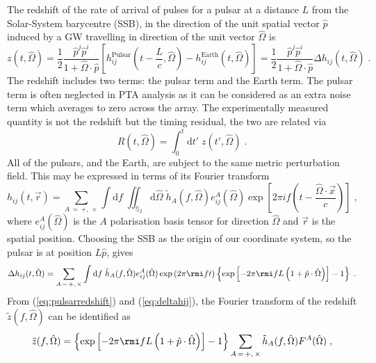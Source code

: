 The redshift of the rate of arrival of pulses for a pulsar at a distance $L$ from the Solar-System barycentre (SSB), in the direction of the unit spatial vector $\hat{p}$ induced by a GW travelling in direction of the unit vector $\hat{\Omega}$ is \citep{anholm-2009}
\begin{equation}\label{eq:pulsarredshift}
z(t,\hat{\Omega})= \frac{1}{2} \frac{\hat{p}^{j}\hat{p}^{i}} {1+\hat{\Omega}\cdot\hat{p}}\left[h_{ij}^{\mathrm{Pulsar}}\left(t-\frac{L}{c},\hat{\Omega} \right)-h_{ij}^{\mathrm{Earth}}(t,\hat{\Omega} )\right] = \frac{1}{2}\frac{\hat{p}^{j}\hat{p}^{i}}{1+\hat{\Omega}\cdot\hat{p}} \Delta h_{ij}(t,\hat{\Omega})\; .
\end{equation}
The redshift includes two terms: the pulsar term and the Earth term. The pulsar term is often neglected in PTA analysis as it can be considered as an extra noise term which averages to zero across the array. The experimentally measured quantity is not the redshift but the timing residual, the two are related via
\begin{equation}\label{eq:restored}
R(t,\hat{\Omega}) = \int_{0}^{t}\mathrm{d}t'\;z(t',\hat{\Omega}) \; .
\end{equation}
All of the pulsars, and the Earth, are subject to the same metric perturbation field. This may be expressed in terms of its Fourier transform
\begin{equation}
h_{ij}(t,\vec{r}) = \sum_{A\,=\,+,\,\times}\int\mathrm{d}f\;\iint_{\mathbb{S}_{2}}\mathrm{d}\hat{\Omega}\; \tilde{h}_{A}(f,\hat{\Omega})e_{ij}^{A}(\hat{\Omega}) \exp\left[2\pi i f \left(t-\frac{\hat{\Omega}\cdot\vec{x}}{c}\right)\right] \; ,
\end{equation}
where $e^{A}_{ij}(\hat{\Omega})$ is the $A$ polarisation basis tensor for direction $\hat{\Omega}$  and $\vec{r}$ is the spatial position. Choosing the SSB as the origin of our coordinate system, so the pulsar is at position $L\hat{p}$, gives
\begin{equation}\label{eq:deltahij}
\Delta h_{ij}(t,\hat{\Omega}) = \sum_{A\,=\,+,\,\times}\int\mathrm{d}f\; \tilde{h}_{A}(f,\hat{\Omega})e_{ij}^{A}(\hat{\Omega})\exp\left(2\pi \rmi f t\right)\left\{\exp\left[-2\pi\rmi fL \left(1+\hat{p}\cdot\hat{\Omega}\right)\right]-1\right\} \; .
\end{equation}
From (\ref{eq:pulsarredshift}) and (\ref{eq:deltahij}), the Fourier transform of the redshift $\tilde{z}(f,\hat{\Omega})$ can be identified as
\begin{equation}\label{eq:45}
\tilde{z}(f,\hat{\Omega}) = \left\{\exp\left[-2\pi\rmi fL \left(1+\hat{p}\cdot\hat{\Omega}\right)\right]-1\right\} \sum_{A\,=\,+,\,\times} \tilde{h}_{A}(f,\hat{\Omega})F^{A}(\hat{\Omega}) \; ,
\end{equation}
